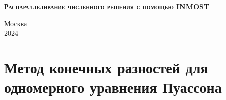 \documentclass[a4paper, 11pt]{article}
\begin{document}
\begin{titlepage}
	\newpage
	
	\begin{center}
	\end{center}
	
	\vspace{8em}
	
	\begin{center}
	\end{center}
	
	\vspace{2em}
	
	\begin{center}
		\textsc{\textbf{Распараллеливание численного решения с помощью INMOST}}
	\end{center}
	
	\vspace{6em}
	
	
	
	\newbox{\lbox}
	\savebox{\lbox}{\hbox{}}
	\newlength{\maxl}
	\setlength{\maxl}{\wd\lbox}
	\hfill\parbox{11cm}{
	}
	
	
	\vspace{\fill}
	
	\begin{center}
		Москва \\ 2024
	\end{center}
	
\end{titlepage}

\setcounter{MaxMatrixCols}{20}

\section{Метод конечных разностей для одномерного уравнения Пуассона}
\end{document}
